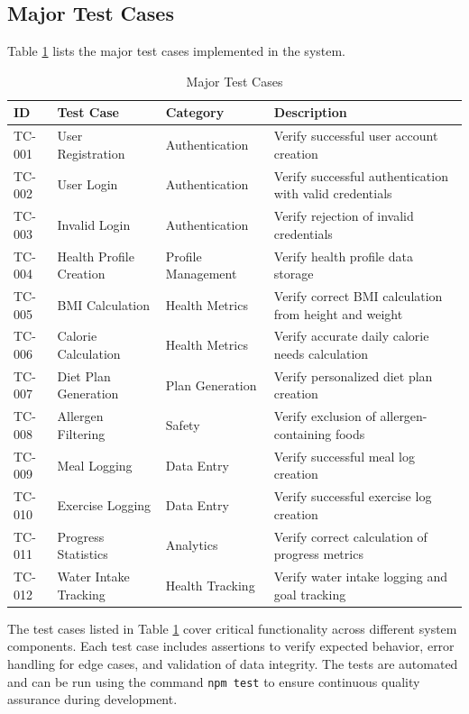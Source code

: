 \subsection{Major Test Cases}

Table \ref{tab:test-cases} lists the major test cases implemented in the system.

\begin{table}[H]
\centering
\caption{Major Test Cases}
\label{tab:test-cases}
\begin{tabular}{|p{1cm}|p{4cm}|p{3cm}|p{4cm}|}
\hline
\textbf{ID} & \textbf{Test Case} & \textbf{Category} & \textbf{Description} \\
\hline
TC-001 & User Registration & Authentication & Verify successful user account creation \\
\hline
TC-002 & User Login & Authentication & Verify successful authentication with valid credentials \\
\hline
TC-003 & Invalid Login & Authentication & Verify rejection of invalid credentials \\
\hline
TC-004 & Health Profile Creation & Profile Management & Verify health profile data storage \\
\hline
TC-005 & BMI Calculation & Health Metrics & Verify correct BMI calculation from height and weight \\
\hline
TC-006 & Calorie Calculation & Health Metrics & Verify accurate daily calorie needs calculation \\
\hline
TC-007 & Diet Plan Generation & Plan Generation & Verify personalized diet plan creation \\
\hline
TC-008 & Allergen Filtering & Safety & Verify exclusion of allergen-containing foods \\
\hline
TC-009 & Meal Logging & Data Entry & Verify successful meal log creation \\
\hline
TC-010 & Exercise Logging & Data Entry & Verify successful exercise log creation \\
\hline
TC-011 & Progress Statistics & Analytics & Verify correct calculation of progress metrics \\
\hline
TC-012 & Water Intake Tracking & Health Tracking & Verify water intake logging and goal tracking \\
\hline
\end{tabular}
\end{table}

The test cases listed in Table \ref{tab:test-cases} cover critical functionality across different system components. Each test case includes assertions to verify expected behavior, error handling for edge cases, and validation of data integrity. The tests are automated and can be run using the command \texttt{npm test} to ensure continuous quality assurance during development.

